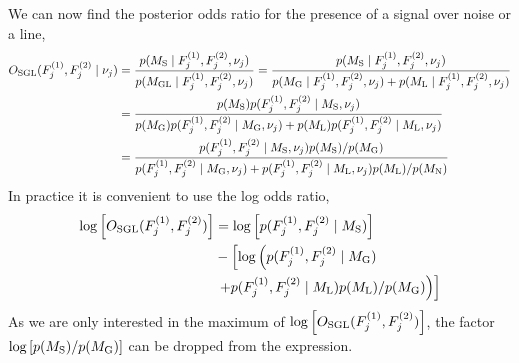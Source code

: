 %
We can now find the posterior odds ratio for the presence of a signal over noise or a line,
\begin{equation}
\label{viterbi:odds}
\begin{split}
O_{\rm{SGL}}(F^{(1)}_{j},F^{(2)}_{j}\mid\nu_j) &=  \frac{p(M_{\rm{S}} \mid F^{(1)}_{j},F^{(2)}_{j} ,\nu_j)}{p(M_{\rm{GL}} \mid F^{(1)}_{j},F^{(2)}_{j},\nu_j)}
= \frac{p(M_{\rm{S}} \mid F^{(1)}_{j},F^{(2)}_{j} ,\nu_j)}{p(M_{\rm{G}} \mid F^{(1)}_{j},F^{(2)}_{j} ,\nu_j) +p(M_{\rm{L}} \mid F^{(1)}_{j},F^{(2)}_{j} ,\nu_j)}\\
&=\frac{p(M_{\rm{S}})p(F^{(1)}_{j},F^{(2)}_{j} \mid M_{\rm{S}},\nu_j)}{p(M_{\rm{G}})p(F^{(1)}_{j},F^{(2)}_{j}\mid M_{\rm{G}},\nu_j) + p(M_{\rm{L}})p(F^{(1)}_{j},F^{(2)}_{j}\mid M_{\rm{L}},\nu_j) } \\
&= \frac{p(F^{(1)}_{j},F^{(2)}_{j} \mid M_{\rm{S}},\nu_j)p(M_{\rm{S}})/p(M_{\rm{G}})}{p(F^{(1)}_{j},F^{(2)}_{j}\mid M_{\rm{G}},\nu_j) + p(F^{(1)}_{j},F^{(2)}_{j}\mid M_{\rm{L}},\nu_j)p(M_{\rm{L}})/p(M_{\rm{N}}) }
\end{split}
\end{equation}
In practice it is convenient to use the log odds ratio,
\begin{equation}
\begin{split}
\label{viterbi:las:logodds}
\log\left[ O_{\rm{SGL}}(F^{(1)}_{j},F^{(2)}_{j})\right] &=  \log\left[ p(F^{(1)}_{j},F^{(2)}_{j} \mid M_{\rm{S}}) \right] \\
&- \left[ \log\left( p(F^{(1)}_{j},F^{(2)}_{j}\mid M_{\rm{G}}) \right. \right. \\
&\left.\left.+  p(F^{(1)}_{j},F^{(2)}_{j}\mid M_{\rm{L}})p(M_{\rm{L}})/p(M_{\rm{G}})\right) \right]
\end{split}
\end{equation}
As we are only interested in the maximum of $\log\left[ O_{\rm{SGL}}(F^{(1)}_{j},F^{(2)}_{j})\right]$, the factor $\log\left[ p(M_{\rm{S}})/p(M_{\rm{G}})\right]$ can be dropped from the expression.


